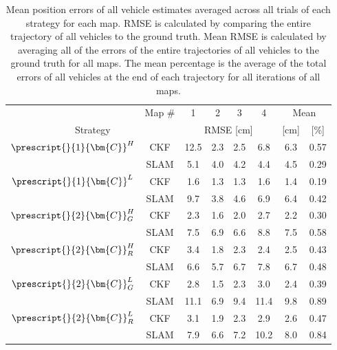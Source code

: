 \begin{table}
	\centering
	\caption{Mean position errors of all vehicle estimates averaged across all trials of each strategy for each map. RMSE is calculated by comparing the entire trajectory of all vehicles to the ground truth. Mean RMSE is calculated by averaging all of the errors of the entire trajectories of all vehicles to the ground truth for all maps. The mean percentage is the average of the total errors of all vehicles at the end of each trajectory for all iterations of all maps. }
	\label{tab:avg_errors}
	\renewcommand{\arraystretch}{1.25}
	\begin{tabular}{c c | c  c  c  c | c c}
		\toprule
		\toprule
		 & Map \#  & 1 & 2 & 3 & 4 & \multicolumn{2}{c}{Mean}\\ 
		\multicolumn{2}{c|}{Strategy} &\multicolumn{4}{c|}{RMSE [cm]} & [cm] & [\%] \\ 
		\midrule
			\multirow{2}{*}{$\prescript{}{1}{\bm{C}}_{}^{H}$}
				& CKF  &   12.5 &    2.3 &    2.5 &    6.8 &    6.3 &   0.57 \\
				& SLAM &    5.1 &    4.0 &    4.2 &    4.4 &    4.5 &   0.29 \\
		\midrule
			\multirow{2}{*}{$\prescript{}{1}{\bm{C}}_{}^{L}$}
				& CKF  &    1.6 &    1.3 &    1.3 &    1.6 &    1.4 &   0.19 \\
				& SLAM &    9.7 &    3.8 &    4.6 &    6.9 &    6.4 &   0.42 \\
		\midrule
			\multirow{2}{*}{$\prescript{}{2}{\bm{C}}_{G}^{H}$}
				& CKF  &    2.3 &    1.6 &    2.0 &    2.7 &    2.2 &   0.30 \\
				& SLAM &    7.5 &    6.9 &    6.6 &    8.8 &    7.5 &   0.58 \\
		\midrule
			\multirow{2}{*}{$\prescript{}{2}{\bm{C}}_{R}^{H}$}
				& CKF  &    3.4 &    1.8 &    2.3 &    2.4 &    2.5 &   0.43 \\
				& SLAM &    6.6 &    5.7 &    6.7 &    7.8 &    6.7 &   0.48 \\
		\midrule
			\multirow{2}{*}{$\prescript{}{2}{\bm{C}}_{G}^{L}$}
				& CKF  &    2.8 &    1.5 &    2.3 &    3.0 &    2.4 &   0.39 \\
				& SLAM &   11.1 &    6.9 &    9.4 &   11.4 &    9.8 &   0.89 \\
		\midrule
			\multirow{2}{*}{$\prescript{}{2}{\bm{C}}_{R}^{L}$}
				& CKF  &    3.1 &    1.9 &    2.3 &    2.9 &    2.6 &   0.47 \\
				& SLAM &    7.9 &    6.6 &    7.2 &   10.2 &    8.0 &   0.84 \\
		\toprule
		\toprule
	\end{tabular}
	\renewcommand{\arraystretch}{1}
\end{table}
